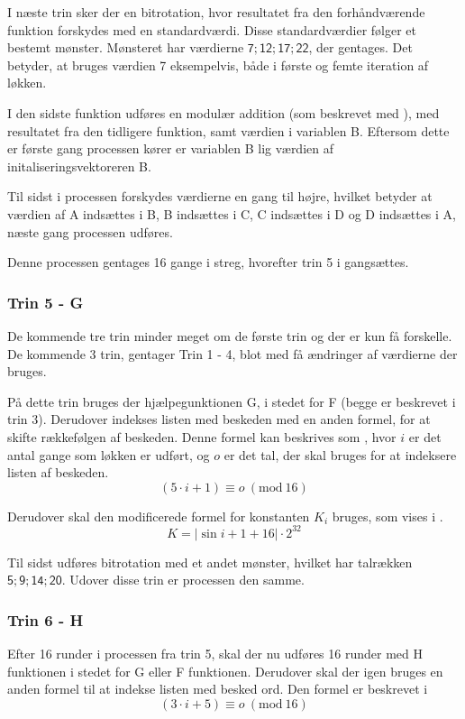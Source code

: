 \documentclass[12pt]{article}
\newcommand{\Mod}[1]{\ (\mathrm{mod}\ #1)}
\begin{document}
I næste trin sker der en bitrotation, hvor resultatet fra den forhåndværende funktion forskydes med en standardværdi. Disse standardværdier følger et bestemt mønster. Mønsteret har værdierne $\mathsf{7; 12; 17; 22}$, der gentages. Det betyder, at bruges værdien 7 eksempelvis, både i første og femte iteration af løkken. 

I den sidste funktion udføres en modulær addition (som beskrevet med \equationautorefname{~\ref{step-4-func}}), med resultatet fra den tidligere funktion, samt værdien i variablen B. Eftersom dette er første gang processen kører er variablen B lig værdien af initaliseringsvektoreren B. 

Til sidst i processen forskydes værdierne en gang til højre, hvilket betyder at værdien af A indsættes i B, B indsættes i C, C indsættes i D og D indsættes i A, næste gang processen udføres. 

Denne processen gentages 16 gange i streg, hvorefter trin 5 i gangsættes. 

\subsubsection{Trin 5 - G}
De kommende tre trin minder meget om de første trin og der er kun få forskelle. De kommende 3 trin, gentager Trin 1 - 4, blot med få ændringer af værdierne der bruges.

På dette trin bruges der hjælpegunktionen G, i stedet for F (begge er beskrevet i trin 3). Derudover indekses listen med beskeden med en anden formel, for at skifte rækkefølgen af beskeden. Denne formel kan beskrives som \equationautorefname{~\ref{step-5}}, hvor $i$ er det antal gange som løkken er udført, og $o$ er det tal, der skal bruges for at indeksere listen af beskeden. 
\begin{equation}\label{step-5}
(5\cdot i + 1) \equiv o \Mod{16}
\end{equation}

Derudover skal den modificerede formel for konstanten $K_i$ bruges, som vises i \equationautorefname{~\ref{step-5-2}} \footnotemark[5].
\begin{equation}\label{step-5-2}
K=| \sin{i+1+16} | \cdot 2^{32}
\end{equation}

Til sidst udføres bitrotation med et andet mønster, hvilket har talrækken $\mathsf{5;9;14;20}$. Udover disse trin er processen den samme. 

\subsubsection{Trin 6 - H}
Efter 16 runder i processen fra trin 5, skal der nu udføres 16 runder med H funktionen i stedet for G eller F funktionen. 
Derudover skal der igen bruges en anden formel til at indekse listen med besked ord. Den formel er beskrevet i \equationautorefname{~\ref{step-6}}
\begin{equation}\label{step-6}
(3\cdot i + 5) \equiv o \Mod{16}
\end{equation}
\end{document}

